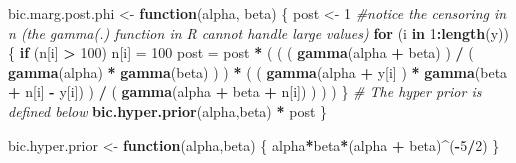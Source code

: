 \documentclass[]{article}
\newenvironment{Shaded}{\begin{snugshade}}{\end{snugshade}}
\newcommand{\KeywordTok}[1]{\textcolor[rgb]{0.13,0.29,0.53}{\textbf{#1}}}
\newcommand{\DecValTok}[1]{\textcolor[rgb]{0.00,0.00,0.81}{#1}}
\newcommand{\StringTok}[1]{\textcolor[rgb]{0.31,0.60,0.02}{#1}}
\newcommand{\CommentTok}[1]{\textcolor[rgb]{0.56,0.35,0.01}{\textit{#1}}}
\newcommand{\ControlFlowTok}[1]{\textcolor[rgb]{0.13,0.29,0.53}{\textbf{#1}}}
\newcommand{\OperatorTok}[1]{\textcolor[rgb]{0.81,0.36,0.00}{\textbf{#1}}}
\newcommand{\NormalTok}[1]{#1}
\begin{document}
\begin{Shaded}
\begin{Highlighting}[]
\NormalTok{bic.marg.post.phi <-}\StringTok{   }\ControlFlowTok{function}\NormalTok{(alpha, beta) \{}
\NormalTok{  post          <-}\StringTok{  }\DecValTok{1}
  \CommentTok{#notice the censoring in n (the gamma(.) function in R cannot handle large values)}
  \ControlFlowTok{for}\NormalTok{ (i }\ControlFlowTok{in} \DecValTok{1}\OperatorTok{:}\KeywordTok{length}\NormalTok{(y)) \{}
    \ControlFlowTok{if}\NormalTok{ (n[i] }\OperatorTok{>}\StringTok{ }\DecValTok{100}\NormalTok{) n[i] =}\StringTok{ }\DecValTok{100}
\NormalTok{    post  =}\StringTok{ }\NormalTok{post }\OperatorTok{*}\StringTok{ }\NormalTok{( }
\NormalTok{      ( ( }\KeywordTok{gamma}\NormalTok{(alpha }\OperatorTok{+}\StringTok{ }\NormalTok{beta) ) }\OperatorTok{/}\StringTok{ }
\StringTok{        }\NormalTok{( }\KeywordTok{gamma}\NormalTok{(alpha) }\OperatorTok{*}\StringTok{ }\KeywordTok{gamma}\NormalTok{(beta) ) ) }\OperatorTok{*}\StringTok{ }
\StringTok{      }\NormalTok{( ( }\KeywordTok{gamma}\NormalTok{(alpha }\OperatorTok{+}\StringTok{ }\NormalTok{y[i] ) }\OperatorTok{*}\StringTok{ }\KeywordTok{gamma}\NormalTok{(beta }\OperatorTok{+}\StringTok{ }\NormalTok{n[i] }\OperatorTok{-}\StringTok{ }\NormalTok{y[i]) ) }\OperatorTok{/}\StringTok{ }
\StringTok{        }\NormalTok{( }\KeywordTok{gamma}\NormalTok{(alpha }\OperatorTok{+}\StringTok{ }\NormalTok{beta }\OperatorTok{+}\StringTok{ }\NormalTok{n[i]) ) ) }
\NormalTok{      )}
\NormalTok{  \}}
  \CommentTok{# The hyper prior is defined below}
  \KeywordTok{bic.hyper.prior}\NormalTok{(alpha,beta) }\OperatorTok{*}\StringTok{ }\NormalTok{post}
\NormalTok{\}}

\NormalTok{bic.hyper.prior <-}\StringTok{  }\ControlFlowTok{function}\NormalTok{(alpha,beta) }
\NormalTok{\{}
\NormalTok{    alpha}\OperatorTok{*}\NormalTok{beta}\OperatorTok{*}\NormalTok{(alpha }\OperatorTok{+}\StringTok{ }\NormalTok{beta)}\OperatorTok{^}\NormalTok{(}\OperatorTok{-}\DecValTok{5}\OperatorTok{/}\DecValTok{2}\NormalTok{)}
\NormalTok{\}}


\end{Highlighting}
\end{Shaded}
\end{document}
